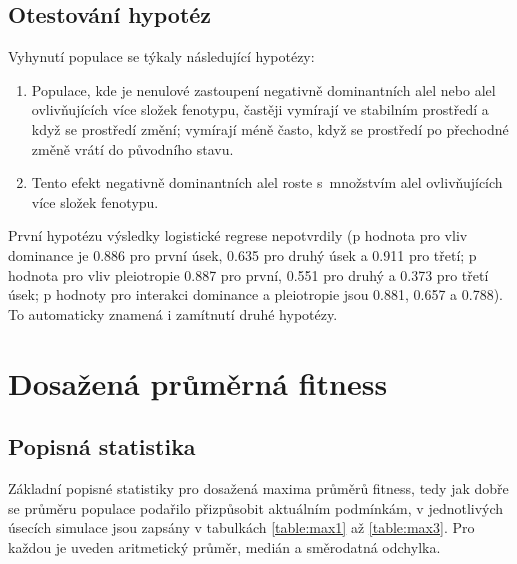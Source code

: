 \subsection{Otestování hypotéz}

Vyhynutí populace se týkaly následující hypotézy:

\begin{enumerate}
    \item{Populace, kde je nenulové zastoupení negativně dominantních alel nebo
        alel ovlivňujících více složek fenotypu, častěji vymírají ve stabilním
        prostředí a když se prostředí změní; vymírají méně často, když se prostředí
        po přechodné změně vrátí do původního stavu.}
    \item{Tento efekt negativně dominantních alel roste s množstvím alel ovlivňujících více složek fenotypu.}
\end{enumerate}

První hypotézu výsledky logistické regrese nepotvrdily (p hodnota pro vliv dominance
je 0.886 pro první úsek,  0.635 pro druhý úsek a 0.911 pro třetí; p hodnota pro vliv pleiotropie 0.887 pro první,
0.551 pro druhý a 0.373 pro třetí úsek; p hodnoty pro interakci dominance a pleiotropie jsou 0.881, 0.657 a 0.788).
To automaticky znamená i zamítnutí druhé hypotézy.


\section{Dosažená průměrná fitness}

\subsection{Popisná statistika}

Základní popisné statistiky pro dosažená maxima průměrů fitness, tedy jak dobře se průměru populace podařilo
přizpůsobit aktuálním podmínkám, v jednotlivých úsecích simulace jsou zapsány v tabulkách \ref{table:max1}
až \ref{table:max3}. Pro každou je uveden aritmetický průměr, medián a směrodatná odchylka.

